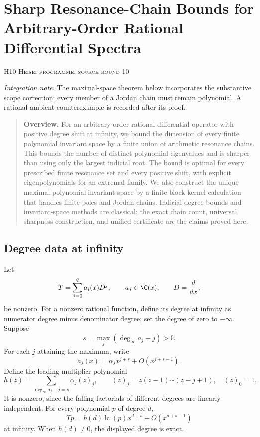 \documentclass[11pt,a4paper]{article}
\theoremstyle{definition}\newtheorem{definition}[theorem]{Definition}
\theoremstyle{remark}\newtheorem{remark}[theorem]{Remark}
\newcommand{\dd}{\frac{d}{dx}}\newcommand{\Span}{\operatorname{span}}\newcommand{\Res}{\operatorname{Res}}
\numberwithin{equation}{section}
\begin{document}
\clearpage
\section[H10 --- Sharp Resonance-Chain Bounds for Arbitrary-Order Rational Differential Spectra]{Sharp Resonance-Chain Bounds for Arbitrary-Order Rational Differential Spectra}\label{contrib-H10}
\noindent\textsc{H10 \quad Heisei programme, source round 10}\par\medskip
\noindent\textit{Integration note.} The maximal-space theorem below incorporates the substantive scope correction: every member of a Jordan chain must remain polynomial. A rational-ambient counterexample is recorded after its proof.\par\medskip






\begin{quote}\small\textbf{Overview.} For an arbitrary-order rational differential operator with positive degree shift at infinity, we bound the dimension of every finite polynomial invariant space by a finite union of arithmetic resonance chains. This bounds the number of distinct polynomial eigenvalues and is sharper than using only the largest indicial root. The bound is optimal for every prescribed finite resonance set and every positive shift, with explicit eigenpolynomials for an extremal family. We also construct the unique maximal polynomial invariant space by a finite block-kernel calculation that handles finite poles and Jordan chains. Indicial degree bounds and invariant-space methods are classical; the exact chain count, universal sharpness construction, and unified certificate are the claims proved here.\end{quote}
\subsection{Degree data at infinity}\label{H10-sec-1}
Let
\[T=\sum_{j=0}^{q}a_j(x)D^j,\qquad a_j\in\C(x),\qquad D=\dd,
\]
be nonzero. For a nonzero rational function, define its degree at infinity as numerator degree minus denominator degree; set the degree of zero to $-\infty$. Suppose
\[s=\max_j(\deg_\infty a_j-j)>0.
\]
For each $j$ attaining the maximum, write
\[a_j(x)=\alpha_jx^{j+s}+O(x^{j+s-1}).\]
Define the leading multiplier polynomial
\begin{equation}\label{H10-h}
h(z)=\sum_{\deg_\infty a_j-j=s}\alpha_j(z)_j,
\qquad (z)_j=z(z-1)\cdots(z-j+1),\quad(z)_0=1.
\end{equation}
It is nonzero, since the falling factorials of different degrees are linearly independent. For every polynomial $p$ of degree $d$,
\begin{equation}\label{H10-lead}
Tp=h(d)\operatorname{lc}(p)x^{d+s}+O(x^{d+s-1})
\end{equation}
at infinity. When $h(d)\ne0$, the displayed degree is exact.
\end{document}
